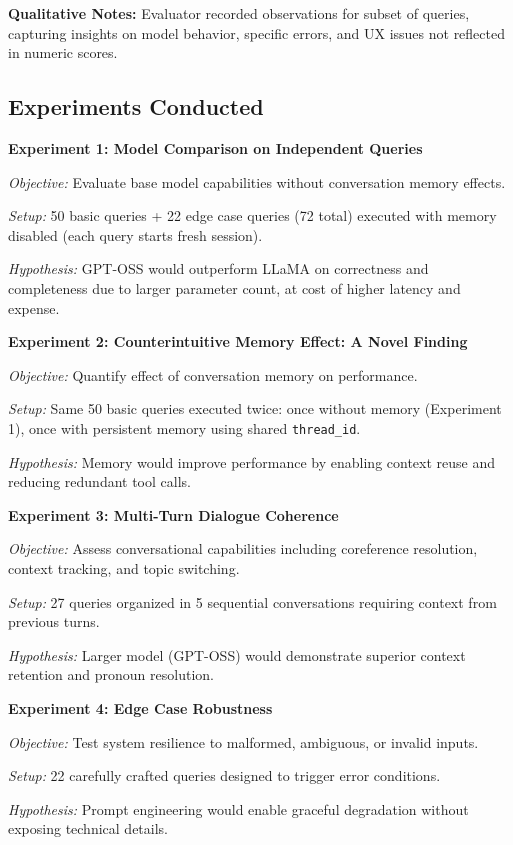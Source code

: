 \documentclass{article}
\begin{document}
\textbf{Qualitative Notes:} Evaluator recorded observations for subset of queries, capturing insights on model behavior, specific errors, and UX issues not reflected in numeric scores.

\subsection{Experiments Conducted}

\textbf{Experiment 1: Model Comparison on Independent Queries}

\textit{Objective:} Evaluate base model capabilities without conversation memory effects.

\textit{Setup:} 50 basic queries + 22 edge case queries (72 total) executed with memory disabled (each query starts fresh session).

\textit{Hypothesis:} GPT-OSS would outperform LLaMA on correctness and completeness due to larger parameter count, at cost of higher latency and expense.

\textbf{Experiment 2: Counterintuitive Memory Effect: A Novel Finding}

\textit{Objective:} Quantify effect of conversation memory on performance.

\textit{Setup:} Same 50 basic queries executed twice: once without memory (Experiment 1), once with persistent memory using shared \texttt{thread\_id}.

\textit{Hypothesis:} Memory would improve performance by enabling context reuse and reducing redundant tool calls.

\textbf{Experiment 3: Multi-Turn Dialogue Coherence}

\textit{Objective:} Assess conversational capabilities including coreference resolution, context tracking, and topic switching.

\textit{Setup:} 27 queries organized in 5 sequential conversations requiring context from previous turns.

\textit{Hypothesis:} Larger model (GPT-OSS) would demonstrate superior context retention and pronoun resolution.

\textbf{Experiment 4: Edge Case Robustness}

\textit{Objective:} Test system resilience to malformed, ambiguous, or invalid inputs.

\textit{Setup:} 22 carefully crafted queries designed to trigger error conditions.

\textit{Hypothesis:} Prompt engineering would enable graceful degradation without exposing technical details.
\end{document}
